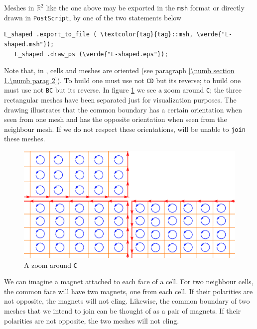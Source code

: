Meshes in $ \mathbb{R}^2 $ like the one above may be exported in the {\small\tt msh} format
or directly drawn in {\small\tt PostScript}, by one of the two statements below

\begin{Verbatim}[commandchars=\\\{\},formatcom=\small\tt,baselinestretch=0.94]
   L_shaped .export_to_file ( \textcolor{tag}{tag}::msh, \verde{"L-shaped.msh"});
   L_shaped .draw_ps (\verde{"L-shaped.eps"});
\end{Verbatim}

Note that, in \maniFEM, cells and meshes are oriented
(see paragraph \ref{\numb section 1.\numb parag 2}).
To build {\small\tt {}} one must use not {\small\tt CD} but its reverse;
to build {\small\tt {}} one must use not {\small\tt BC} but its reverse.
In figure \ref{\numb section 1.\numb fig 6} we see a zoom around {\small\tt C};
the three rectangular meshes have been separated just for visualization purposes.
The drawing illustrates that the common boundary has a certain orientation when seen
from one mesh and has the opposite orientation when seen from the neighbour mesh.
If we do not respect these orientations, {\maniFEM} will be unable to {\small\tt join}
these meshes.

\begin{figure}[ht]  \centering
  \includegraphics[width=120mm]{L-crack}
  \caption{A zoom around {\small\tt C}}
  \label{\numb section 1.\numb fig 6}
\end{figure}

We can imagine a magnet attached to each face of a cell.
For two neighbour cells, the common face will have two magnets, one from each cell.
If their polarities are not opposite, the magnets will not cling.
Likewise, the common boundary of two meshes that we intend to join can be thought of
as a pair of magnets.
If their polarities are not opposite, the two meshes will not cling.

